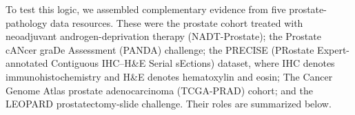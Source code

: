 
To test this logic, we assembled complementary evidence from five prostate-pathology data
resources. These were the prostate cohort treated with neoadjuvant androgen-deprivation
therapy (NADT-Prostate); the Prostate cANcer graDe Assessment (PANDA) challenge; the PRECISE
(PRostate Expert-annotated Contiguous IHC--H\&E Serial sEctions) dataset, where IHC denotes
immunohistochemistry and H\&E denotes hematoxylin and eosin; The Cancer Genome Atlas prostate
adenocarcinoma (TCGA-PRAD) cohort; and the
LEOPARD prostatectomy-slide challenge. Their roles are summarized below.

